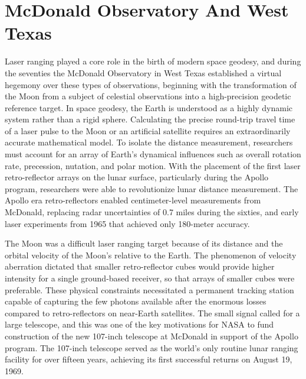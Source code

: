 \section{McDonald Observatory And West Texas}

Laser ranging played a core role in the birth of modern space geodesy, and during the seventies the McDonald Observatory in West Texas established a virtual hegemony over these types of observations, beginning with the transformation of the Moon from a subject of celestial observations into a high-precision geodetic reference target. In space geodesy, the Earth is understood as a highly dynamic system rather than a rigid sphere. Calculating the precise round-trip travel time of a laser pulse to the Moon or an artificial satellite requires an extraordinarily accurate mathematical model. To isolate the distance measurement, researchers must account for an array of Earth's dynamical influences such as overall rotation rate, precession, nutation, and polar motion. With the placement of the first laser retro-reflector arrays on the lunar surface, particularly during the Apollo program, researchers were able to revolutionize lunar distance measurement. The Apollo era retro-reflectors enabled centimeter-level measurements from McDonald, replacing radar uncertainties of 0.7 miles during the sixties, and early laser experiments from 1965 that achieved only 180-meter accuracy.

The Moon was a difficult laser ranging target because of its distance and the orbital velocity of the Moon’s relative to the Earth. The phenomenon of velocity aberration dictated that smaller retro-reflector cubes would provide higher intensity for a single ground-based receiver, so that arrays of smaller cubes were preferable. These physical constraints necessitated a permanent tracking station capable of capturing the few photons available after the enormous losses compared to retro-reflectors on near-Earth satellites. The small signal called for a large telescope, and this was one of the key motivations for NASA to fund construction of the new 107-inch telescope at McDonald in support of the Apollo program. The 107-inch telescope served as the world’s only routine lunar ranging facility for over fifteen years, achieving its first successful returns on August 19, 1969. 


